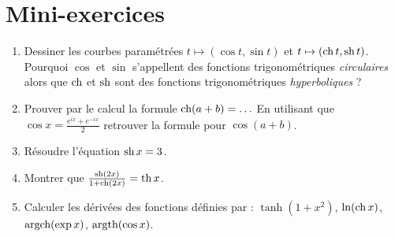 \section*{Mini-exercices}

\begin{frame}
\begin{miniexercice}
\begin{enumerate}
  \item Dessiner les courbes paramétrées $t \mapsto (\cos t, \sin t)$ et $t \mapsto (\mathop{\text{ch}}\nolimits t, \mathop{\text{sh}}\nolimits t)$.
Pourquoi $\cos$ et $\sin$ s'appellent des fonctions trigonométriques \emph{circulaires} alors que 
$\mathop{\text{ch}}\nolimits$ et $\mathop{\text{sh}}\nolimits$ sont des fonctions trigonométriques \emph{hyperboliques} ?
  \item Prouver par le calcul la formule $\mathop{\text{ch}}\nolimits(a+b)=\ldots$ En utilisant que $\cos x = \frac{e^{ix}+e^{-ix}}{2}$
retrouver la formule pour $\cos(a+b)$.
  \item Résoudre l'équation $\mathop{\text{sh}}\nolimits x = 3$.
  \item Montrer que $\frac{\mathop{\text{sh}}\nolimits(2x)}{1+\mathop{\text{ch}}\nolimits(2x)} = \mathop{\text{th}}\nolimits x$.
  \item Calculer les dérivées des fonctions définies par : 
  $\tanh(1+x^2)$, $\ln(\mathop{\text{ch}}\nolimits x)$, $\mathop{\text{argch}}\nolimits(\exp x)$, $\mathop{\text{argth}}\nolimits(\cos x)$. 
\end{enumerate}
\end{miniexercice}


\end{frame}


